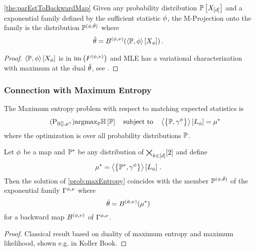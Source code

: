 \begin{theorem}\ref{the:parEstToBackwardMap}
	Given any probability distribution $\mathbb{P}\left[X_{[d]}\right]$ and a exponential family defined by the sufficient statistic $\phi$, the M-Projection onto the family is the distribution $\mathbb{P}^{(\phi,\hat{\theta})}$ where
	\begin{align*}
		\hat{\theta} = B^{(\phi,\nu)}(\left\langle \mathbb{P},\phi\right\rangle \left[ X_{\phi} \right]) \, .
	\end{align*}
\end{theorem}
\begin{proof}
	$\left\langle \mathbb{P},\phi\right\rangle \left[ X_{\phi} \right]$ is in $\mathrm{im}\left(F^{(\phi,\nu)}\right)$ and MLE has a variational characterization with maximum at the dual $\hat{\theta}$, see \cite{wainwright_graphical_2008}.
\end{proof}





\subsubsection{Connection with Maximum Entropy}\label{sec:maxEntDuality}


The Maximum entropy problem with respect to matching expected statistics is
\begin{align}\tag{$\mathrm{P}_{\sentropyof{}, \genmean}$}\label{prob:maxEntropy}
	\argmax_{\probtensor} \sentropyof{\probtensor} \quad \text{subject to} \quad 
	 \sbcontractionof{\probtensor,\sencodingof{\sstat}}{\selvariableof{\sstat}} =  \genmean
\end{align}
where the optimization is over all probability distributions $\mathbb{P}$.


\begin{theorem}\label{the:maxEntMaxLikeDuality}
	Let $\phi$ be a map and $\mathbb{P}^*$ be any distribution of $\bigtimes_{k\in[d]}[2]$ and define
		\[ \mu^* = \left\langle \left\{\mathbb{P}^*,\gamma^{\phi}\right\}\right\rangle \left[ L_{\phi} \right] \, .  \]
	Then the solution of \ref{prob:maxEntropy} coincides with the member $\mathbb{P}^{(\phi,\hat{\theta})}$ of the exponential family $\Gamma^{\phi,\nu}$ where
		\[ \hat{\theta} = B^{(\phi,\nu)}(\mu^*)\]
	for a backward map $B^{(\phi,\nu)}$ of $\Gamma^{\phi,\nu}$.
\end{theorem}
\begin{proof}
	Classical result based on duality of maximum entropy and maximum likelihood, shown e.g. in Koller Book.
\end{proof}

